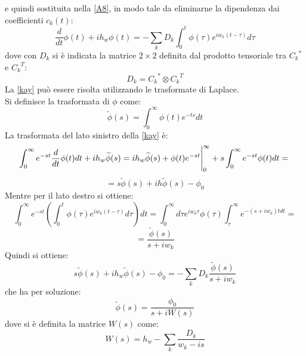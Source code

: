 e quindi sostituita nella \eqref{A8}, in modo tale da eliminarne la dipendenza dai coefficienti $c_k(t)$:
\begin{equation}\label{kay}
 \frac{d}{dt} \phi(t) +ih_w\phi(t) = -\sum_{k}D_k\int_{0}^{t} \phi(\tau)e^{iw_k(t-\tau)} d\tau
\end{equation}
dove con $D_k$ si \`e indicata la matrice $2\times2$ definita dal prodotto tensoriale tra ${C_k}^*$ e ${C_k}^T$:
\begin{equation}\label{3}
 D_k = {C_k}^*\otimes{C_k}^T
\end{equation}
La \eqref{kay} pu\`o essere risolta utilizzando le trasformate di Laplace.\\
Si definisce la trasformata di $\phi$ come:
\begin{equation}
 \widetilde{\phi}(s) = \int_{0}^{\infty} \phi(t)e^{-ts} dt
\end{equation}
La trasformata del lato sinistro della \eqref{kay} \`e:
\begin{equation}
\int_{0}^{\infty} e^{-st}\frac{d}{dt}\phi(t) dt + ih_w\widetilde{\phi}(s) = \\
ih_w\widetilde{\phi}(s) + \phi(t)e^{-st}\Bigg|_{0}^{\infty} + s\int_{0}^{\infty} e^{-st}\phi(t)dt = \\
\end{equation}
\begin{equation}
= s\widetilde{\phi}(s) + ih\widetilde{\phi}(s) - \phi_0
\end{equation}
Mentre per il lato destro si ottiene:
\begin{equation}
 \int_{0}^{\infty} e^{-st}(\int_{0}^{t}\phi(\tau)e^{iw_k(t-\tau)} d\tau)dt = \int_{0}^{\infty}d\tau e^{iw_k\tau}\phi(\tau)\int_{\tau}^{\infty} e^{-(s+iw_k)t dt} =
\end{equation}
\begin{equation}
= \frac{\widetilde{\phi}(s)}{s + iw_k}
\end{equation}
Quindi si ottiene:
\begin{equation}
 s\widetilde{\phi}(s) + ih_w\widetilde{\phi}(s) - \phi_0 = - \sum_{k} D_k\frac{\widetilde{\phi}(s)}{s + iw_k}
\end{equation}
che ha per soluzione:
\begin{equation}\label{key}
 \widetilde{\phi}(s) = \frac{\phi_0}{s+iW(s)}
\end{equation}
dove si \`e definita la matrice $W(s)$ come:
\begin{equation}
 W(s) = h_w - \sum_{k} \frac{D_k}{w_k - is}
\end{equation}
